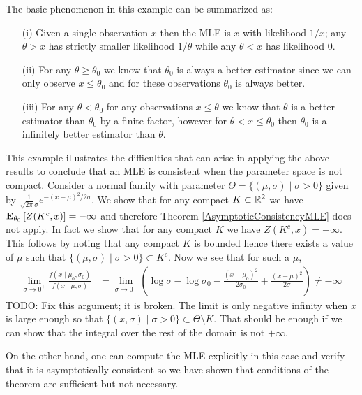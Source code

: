 \begin{examp}
The basic
phenomenon in this example can be summarized as:
\begin{itemize}
\item[(i)] Given a single observation $x$ then the
MLE is $x$ with likelihood $1/x$; any $\theta > x$ has strictly smaller
likelihood $1/\theta$ while any $\theta < x$ has likelihood $0$.
\item[(ii)] For any $\theta \geq \theta_0$ we know that $\theta_0$ is
  always a better estimator since we can only observe $x \leq
  \theta_0$ and for these observations $\theta_0$ is always better.
\item[(iii)] For any $\theta < \theta_0$ for any observations $x \leq
  \theta$ we know that $\theta$ is a better estimator than $\theta_0$
  by a finite factor, however for $\theta < x \leq \theta_0$ then
  $\theta_0$ is a infinitely better estimator than $\theta$.
\end{itemize}
\end{examp}

\begin{examp}
This example illustrates the difficulties that can arise in applying
the above results to conclude that an MLE is consistent when the
parameter space is not compact.  Consider a
normal family with parameter $\Theta = \lbrace (\mu, \sigma) \mid
\sigma > 0 \rbrace$ given by
$\frac{1}{\sqrt{2 \pi}\sigma} e^{-(x - \mu)^2/2\sigma}$.  We show that
for any compact $K \subset \reals^2$ we have $\sexpectation{Z(K^c, x)}{\theta_0}
= -\infty$ and therefore Theorem \ref{AsymptoticConsistencyMLE} does
not apply.  In fact we show that for any compact $K$ we have $Z(K^c,
x) = -\infty$.  This follows by noting that any compact $K$ is bounded
hence there exists a value of $\mu$ such that $\lbrace (\mu, \sigma)
\mid \sigma > 0\rbrace \subset K^c$.  Now we see that for such a
$\mu$, 
\begin{align*}
\lim_{\sigma \to 0^+} \frac{f(x\mid \mu_0, \sigma_0)}{f(x \mid \mu,
  \sigma)} &= \lim_{\sigma \to 0^+} \left( \log \sigma - \log \sigma_0
  - \frac{(x - \mu_0)^2}{2\sigma_0} + \frac{(x - \mu)^2}{2\sigma}
\right ) \neq -\infty
\end{align*}
TODO: Fix this argument; it is broken.  The limit is only negative
infinity when $x$ is large enough so that $\lbrace (x, \sigma) \mid
\sigma > 0 \rbrace \subset \Theta \setminus K$.  That should be enough
if we can show that the integral over the rest of the domain is not $+\infty$.

On the other hand, one can compute the MLE explicitly in this case and
verify that it is asymptotically consistent so we have shown that
conditions of the theorem are sufficient but not necessary.
\end{examp}

